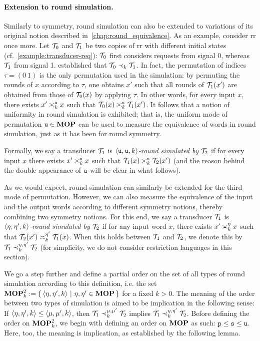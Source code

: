 \paragraph*{Extension to round simulation.}
Similarly to symmetry, round simulation can also be extended to variations of its original notion described in~\cref{chap:round_equivalence}.
As an example, consider \gls{rr} once more. Let $\cT_0$ and $\cT_1$ be two copies of \gls{rr} with different initial states (cf.~\cref{example:transducer-req}): $\cT_0$ first considers requests from signal 0, whereas $\cT_1$ from signal 1.  established that $\cT_0\prec_k \cT_1$. In fact, the permutation of indices $\tau=(0\ 1)$ is the only permutation used in the simulation: by permuting the rounds of $x$ according to $\tau$, one obtains $x'$ such that all rounds of $\cT_1(x')$ are obtained from those of $\cT_0(x)$ by applying $\tau$. In other words, for every input $x$, there exists $x'\reqtype[k]{u} x$ such that $\cT_0(x)\reqtype[k]{u} \cT_1(x')$. It follows that a notion of uniformity in round simulation is exhibited; that is, the uniform mode of permutation $\rstype{u}\in\RSTYPES$ can be used to measure the equivalence of words in round simulation, just as it has been for round symmetry.

Formally, we say a transducer $\cT_1$ is \emph{$\tup{\rstype{u}, \rstype{u}, k}$-round simulated by $\cT_2$} if for every input $x$ there exists $x'\reqtype[k]{u} x$ such that $\cT_1(x)\reqtype[k]{u} \cT_2(x')$ (and the reason behind the double appearance of $\rstype{u}$ will be clear in what follows).

As we would expect, round simulation can similarly be extended for the third mode of permutation.
However, we can also measure the equivalence of the input and the output words according to different symmetry notions, thereby combining two symmetry notions.
For this end, we say a transducer $\cT_1$ is \emph{$\tup{\eta, \eta', k}$-round simulated by $\cT_2$} if for any input word $x$, there exists $x'\req[k]^\eta x$ such that $\cT_2(x')\req[k]^{\eta'} \cT_1(x)$. When this holds between $\cT_1$ and $\cT_2$, we denote this by $\cT_1 \prec_{k}^{\eta,\eta'} \cT_2$ (for simplicity, we do not consider restriction languages in this section).

We go a step further and define a partial order on the set of all types of round simulation according to this definition, i.e. the set $\RSTUPS:=\condset{\tup{\eta, \eta', k}}{\eta,\eta'\in \RSTYPES}$ for a fixed $k>0$. The meaning of the order between two types of simulation is aimed to be implication in the following sense:
If $\tup{\eta,\eta',k}\leq \tup{\mu,\mu',k}$, then $\cT_1 \prec_{k}^{\mu,\mu'} \cT_2$ implies $\cT_1 \prec_{k}^{\eta,\eta'} \cT_2$. Before defining the order on $\RSTUPS$, we begin with defining an order on $\RSTYPES$ as such: $\rstype{p}\leq \rstype{s}\leq \rstype{u}$. Here, too, the meaning is implication, as established by the following lemma.

